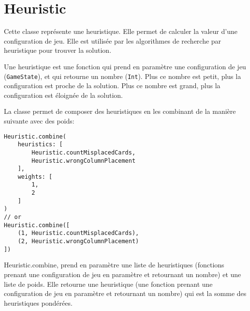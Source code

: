 \section{Heuristic}
Cette classe représente une heuristique. Elle permet de calculer la valeur d'une configuration de jeu. Elle est utilisée par les algorithmes de recherche par heuristique pour trouver la solution.

Une heuristique est une fonction qui prend en paramètre une configuration de jeu (\texttt{GameState}), et qui retourne un nombre (\texttt{Int}). Plus ce nombre est petit, plus la configuration est proche de la solution. Plus ce nombre est grand, plus la configuration est éloignée de la solution.

La classe permet de composer des heuristiques en les combinant de la manière suivante avec des poids:
\begin{lstlisting}
Heuristic.combine(
    heuristics: [
        Heuristic.countMisplacedCards,
        Heuristic.wrongColumnPlacement
    ],
    weights: [
        1,
        2
    ]
)
// or
Heuristic.combine([
    (1, Heuristic.countMisplacedCards),
    (2, Heuristic.wrongColumnPlacement)
])
\end{lstlisting}
Heuristic.combine, prend en paramètre une liste de heuristiques (fonctions prenant une configuration de jeu en paramètre et retournant un nombre) et une liste de poids. Elle retourne une heuristique (une fonction prenant une configuration de jeu en paramètre et retournant un nombre) qui est la somme des heuristiques pondérées.

